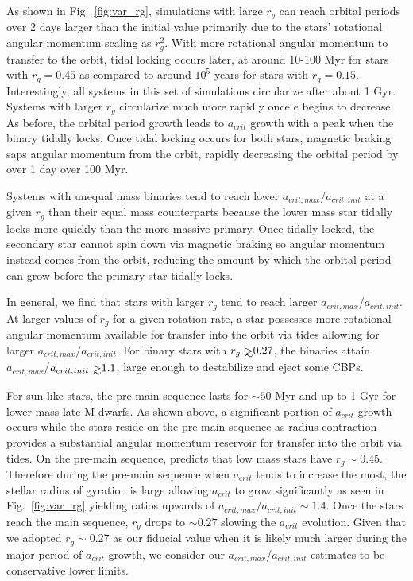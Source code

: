 As shown in Fig.~\ref{fig:var_rg}, simulations with large $r_g$ can reach orbital periods over 2 days larger than the initial value primarily due to the stars' rotational angular momentum scaling as $r_g^2$.  With more rotational angular momentum to transfer to the orbit, tidal locking occurs later, at around 10-100 Myr for stars with $r_g=0.45$ as compared to around $10^5$ years for stars with $r_g=0.15$.  Interestingly, all systems in this set of simulations circularize after about 1 Gyr.  Systems with larger $r_g$ circularize much more rapidly once $e$ begins to decrease.  As before, the orbital period growth leads to $a_{crit}$ growth with a peak when the binary tidally locks.  Once tidal locking occurs for both stars, magnetic braking saps angular momentum from the orbit, rapidly decreasing the orbital period by over 1 day over 100 Myr.

Systems with unequal mass binaries tend to reach lower $a_{crit,max}$/$a_{crit,init}$ at a given $r_g$ than their equal mass counterparts because the lower mass star tidally locks more quickly than the more massive primary.  Once tidally locked, the secondary star cannot spin down via magnetic braking so angular momentum instead comes from the orbit, reducing the amount by which the orbital period can grow before the primary star tidally locks.

In general, we find that stars with larger $r_g$ tend to reach larger $a_{crit,max}$/$a_{crit,init}$.  At larger values of $r_g$ for a given rotation rate, a star possesses more rotational angular momentum available for transfer into the orbit via tides allowing for larger $a_{crit,max}$/$a_{crit,init}$.  For binary stars with $r_g \gsim 0.27$, the binaries attain $a_{crit,max}$/$a_{crit,init} \gsim 1.1$, large enough to destabilize and eject some CBPs.  

For sun-like stars, the pre-main sequence lasts for ${\sim} 50$ Myr and up to 1 Gyr for lower-mass late M-dwarfs.  As shown above, a significant portion of  $a_{crit}$ growth occurs while the stars reside on the pre-main sequence as radius contraction provides a substantial angular momentum reservoir for transfer into the orbit via tides.  On the pre-main sequence, \citet{Baraffe2015} predicts that low mass stars have $r_{g}{\sim}0.45$.  Therefore during the pre-main sequence when $a_{crit}$ tends to increase the most, the stellar radius of gyration is large allowing $a_{crit}$ to grow significantly as seen in Fig.~\ref{fig:var_rg} yielding ratios upwards of $a_{crit,max}$/$a_{crit,init} {\sim} 1.4$.  Once the stars reach the main sequence, $r_{g}$ drops to ${\sim}0.27$ slowing the $a_{crit}$ evolution.  Given that we adopted $r_{g}{\sim}0.27$ as our fiducial value when it is likely much larger during the major period of $a_{crit}$ growth, we consider our $a_{crit,max}$/$a_{crit,init}$ estimates to be conservative lower limits. 

